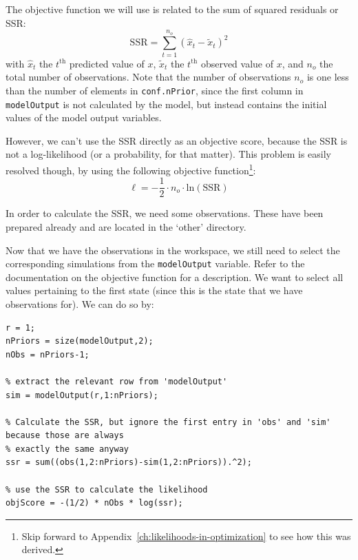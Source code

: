 
The objective function we will use is related to the sum of squared residuals  or SSR:
\begin{equation}\label{eq:SSR}
\mathrm{SSR} = \displaystyle\sum\limits_{t=1}^{n_o}(\hat{x}_{t}-\tilde{x}_{t})^2
\end{equation}
with $\hat{x}_{t}$ the $t^{\mathrm{th}}$ predicted value of $x$, $\tilde{x}_{t}$ the $t^{\mathrm{th}}$ observed value of $x$, and $n_o$ the total number of observations. Note that the number of observations $n_o$ is one less than the number of elements in \texttt{conf.nPrior}, since the first column in \texttt{modelOutput} is not calculated by the model, but instead contains the initial values of the model output variables.

However, we can't use the SSR directly as an objective score, because the SSR is not a log-likelihood (or a probability, for that matter). This problem is easily resolved though, by using the following objective function\footnote{Skip forward to Appendix~\ref{ch:likelihoods-in-optimization} to see how this was derived.}:
\begin{equation}\label{eq:objScore}
\ell = -\frac{1}{2} \cdot{} n_o \cdot{} \mathrm{ln}\left(\mathrm{SSR}\right)
\end{equation}

In order to calculate the SSR, we need some observations. These have been prepared already and are located in the `other' directory.




Now that we have the observations in the workspace, we still need to select the corresponding simulations from the \texttt{modelOutput} variable. Refer to the documentation on the objective function for a description. We want to select all values pertaining to the first state (since this is the state that we have observations for). We can do so by:


\begin{lstlisting}[style=basic,style=matlab]
% row of interest in 'modelOutput' is #1
r = 1;
nPriors = size(modelOutput,2);
nObs = nPriors-1;

% extract the relevant row from 'modelOutput'
sim = modelOutput(r,1:nPriors);

% Calculate the SSR, but ignore the first entry in 'obs' and 'sim' because those are always
% exactly the same anyway
ssr = sum((obs(1,2:nPriors)-sim(1,2:nPriors)).^2);

% use the SSR to calculate the likelihood
objScore = -(1/2) * nObs * log(ssr);
\end{lstlisting}

